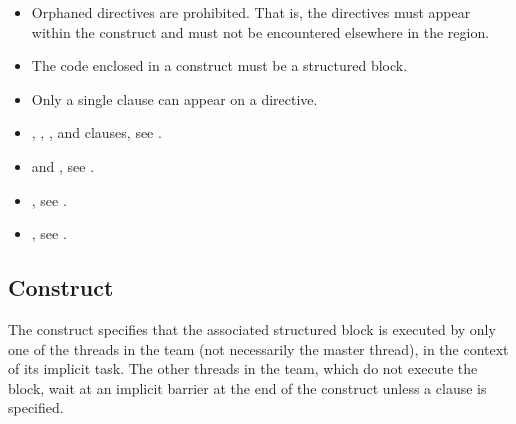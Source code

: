 \begin{itemize}
\item Orphaned  directives are prohibited. That is, the  directives must
appear within the  construct and must not be encountered elsewhere in the
 region.

\item The code enclosed in a  construct must be a structured block.

\item Only a single  clause can appear on a  directive.

\end{itemize}

\crossreferences
\begin{itemize}
\item {}, , , and  clauses, see
.

\item {} and , see
  .

\item {}, see .

\item {}, see
.
\end{itemize}










\subsection{ Construct}
\label{subsec:single Construct}
\summary
The  construct specifies that the associated structured block is executed by only
one of the threads in the team (not necessarily the master thread), in the context of its
implicit task. The other threads in the team, which do not execute the block, wait at an
implicit barrier at the end of the  construct unless a  clause is specified.

